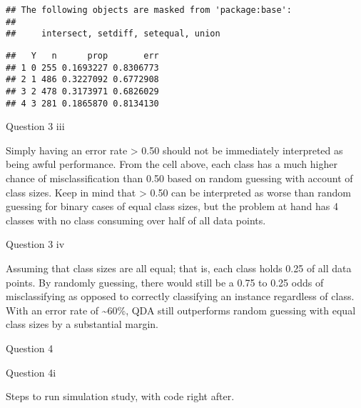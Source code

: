\documentclass[
]{article}
\newenvironment{Shaded}{\begin{snugshade}}{\end{snugshade}}
\newcommand{\AttributeTok}[1]{\textcolor[rgb]{0.77,0.63,0.00}{#1}}
\newcommand{\DecValTok}[1]{\textcolor[rgb]{0.00,0.00,0.81}{#1}}
\newcommand{\FunctionTok}[1]{\textcolor[rgb]{0.00,0.00,0.00}{#1}}
\newcommand{\NormalTok}[1]{#1}
\newcommand{\OtherTok}[1]{\textcolor[rgb]{0.56,0.35,0.01}{#1}}
\newcommand{\SpecialCharTok}[1]{\textcolor[rgb]{0.00,0.00,0.00}{#1}}
\begin{document}
\begin{verbatim}
## The following objects are masked from 'package:base':
## 
##     intersect, setdiff, setequal, union
\end{verbatim}

\begin{Shaded}
\end{Shaded}

\begin{verbatim}
##   Y   n      prop       err
## 1 0 255 0.1693227 0.8306773
## 2 1 486 0.3227092 0.6772908
## 3 2 478 0.3173971 0.6826029
## 4 3 281 0.1865870 0.8134130
\end{verbatim}

Question 3 iii

Simply having an error rate \textgreater{} 0.50 should not be
immediately interpreted as being awful performance. From the cell above,
each class has a much higher chance of misclassification than 0.50 based
on random guessing with account of class sizes. Keep in mind that
\textgreater{} 0.50 can be interpreted as worse than random guessing for
binary cases of equal class sizes, but the problem at hand has 4 classes
with no class consuming over half of all data points.

Question 3 iv

Assuming that class sizes are all equal; that is, each class holds 0.25
of all data points. By randomly guessing, there would still be a 0.75 to
0.25 odds of misclassifying as opposed to correctly classifying an
instance regardless of class. With an error rate of \textasciitilde60\%,
QDA still outperforms random guessing with equal class sizes by a
substantial margin.

Question 4

Question 4i

Steps to run simulation study, with code right after.
\end{document}
